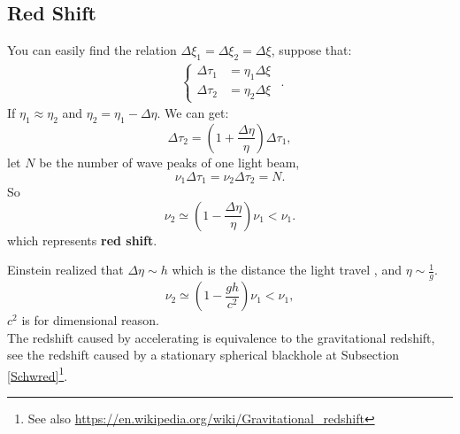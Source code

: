 \documentclass[openany,10pt]{book}
\theoremstyle{definition}
\theoremstyle{definition}
\theoremstyle{remark}
\begin{document}
\subsection{Red Shift}
You can easily find the relation $\Delta \xi_1=\Delta \xi_2=\Delta \xi$, suppose that:
\begin{equation}
    \begin{aligned}\begin{cases}
    \Delta\tau_1&=\eta_1\Delta\xi\\
    \Delta\tau_2&=\eta_2\Delta\xi
    \end{cases}
    \end{aligned}.
\end{equation}
If $\eta_1\approx\eta_2$ and $\eta_2=\eta_1-\Delta\eta$. We can get:
\begin{equation}
    \Delta\tau_2=(1+\frac{\Delta\eta}{\eta})\Delta\tau_1,
\end{equation}
let $N$ be the number of wave peaks of one light beam,
\begin{equation}
    \nu_1\Delta\tau_1=\nu_2\Delta\tau_2=N.
\end{equation}
So
\begin{equation}
    \nu_2\simeq(1-\frac{\Delta\eta}{\eta})\nu_1<\nu_1.
\end{equation}
which represents \textbf{red shift}.

Einstein realized that $\Delta \eta\sim h$ which is the distance the light travel , and $\eta \sim \frac1g$.
\begin{equation}
    \nu_2\simeq(1-\frac{gh}{c^2})\nu_1<\nu_1,
\end{equation}
$c^2$ is for dimensional reason.\\
The redshift caused by accelerating is equivalence to the gravitational redshift, see the redshift caused by a stationary spherical blackhole at Subsection \ref{Schwred}\footnote{See also \url{ https://en.wikipedia.org/wiki/Gravitational_redshift}}.
\end{document}
